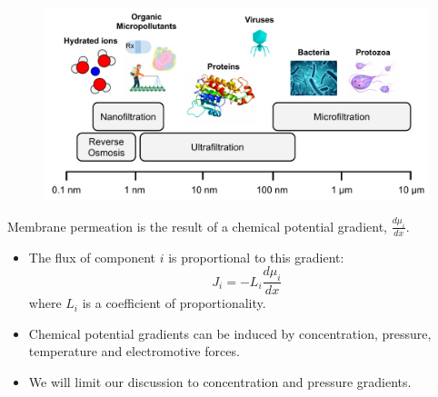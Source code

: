   \begin{figure}
  \centering
  \includegraphics[width=\textwidth]{figs/membrane_separation_size_regimes.pdf}
  \caption{}\label{fig:size_regimes}
  \end{figure}

  \noindent Membrane permeation is the result of a chemical potential gradient, $\frac{d\mu_i}{dx}$.
  \begin{itemize}
	  \item The flux of component $i$ is proportional to this gradient:
	  \begin{equation}
	    J_i = -L_i \frac{d\mu_i}{dx}
	  \end{equation}
	  where $L_i$ is a coefficient of proportionality.~\cite{wijmans_solution-diffusion_1995}
	  \item Chemical potential gradients can be induced by concentration, pressure, 
	  temperature and electromotive forces.
	  \item We will limit our discussion to concentration and pressure gradients. %
  \end{itemize}

